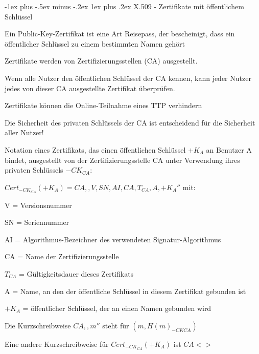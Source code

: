 \documentclass[a4paper]{article}
\makeatletter
\renewcommand{\subsubsection}{\@startsection{subsubsection}{3}{0mm}%
 {-1ex plus -.5ex minus -.2ex}%
 {1ex plus .2ex}%
 {\normalfont\small\bfseries}}
\makeatother
\begin{document}
\begin{multicols}{3}
      \subsubsection{X.509 - Zertifikate mit öffentlichem Schlüssel}
      \begin{itemize*}
            \item Ein Public-Key-Zertifikat ist eine Art Reisepass, der bescheinigt,
            dass ein öffentlicher Schlüssel zu einem bestimmten Namen gehört
            \item Zertifikate werden von Zertifizierungsstellen (CA) ausgestellt.
            \item Wenn alle Nutzer den öffentlichen Schlüssel der CA kennen, kann jeder
            Nutzer jedes von dieser CA ausgestellte Zertifikat überprüfen.
            \item Zertifikate können die Online-Teilnahme eines TTP verhindern
            \item Die Sicherheit des privaten Schlüssels der CA ist entscheidend für die
            Sicherheit aller Nutzer!
            \item Notation eines Zertifikats, das einen öffentlichen Schlüssel $+K_A$
            an Benutzer A bindet, ausgestellt von der Zertifizierungsstelle CA
            unter Verwendung ihres privaten Schlüssels $-CK_{CA}$:
            \begin{itemize*}
                  \item $Cert_{-CK_{CA}}(+K_A) = CA,,V, SN, AI, CA, T_{CA}, A, +K_A''$ mit:
                  \begin{itemize*} \item V = Versionsnummer \item SN = Seriennummer \item AI = Algorithmus-Bezeichner des verwendeten Signatur-Algorithmus \item CA = Name der Zertifizierungsstelle \item $T_{CA}$ = Gültigkeitsdauer dieses Zertifikats \item A = Name, an den der öffentliche Schlüssel in diesem Zertifikat gebunden ist \item $+K_A$ = öffentlicher Schlüssel, der an einen Namen gebunden wird \end{itemize*}
                  \item Die Kurzschreibweise $CA,,m''$ steht für $(m,{H(m)}_{{-CK}{CA}})$
                  \item Eine andere Kurzschreibweise für $Cert_{-CK_{CA}}(+K_A)$ ist $CA<>$
            \end{itemize*}
      \end{itemize*}



\end{multicols}
\end{document}
